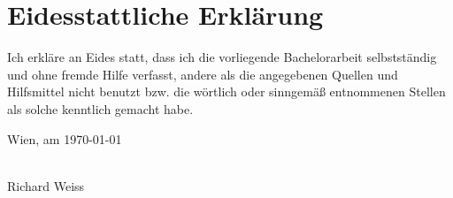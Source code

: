 \chapter*{Eidesstattliche Erklärung}
\thispagestyle{empty}
\thispagestyle{empty}

\vspace*{2cm}

Ich erkläre an Eides statt, dass ich die vorliegende Bachelorarbeit selbstständig und ohne fremde Hilfe verfasst, andere als die angegebenen Quellen und Hilfsmittel nicht benutzt bzw. die wörtlich oder sinngemäß entnommenen Stellen als solche kenntlich gemacht habe.

\vspace*{3cm}

\noindent
Wien, am \today
%
\hfill 
%
\begin{minipage}[t]{5cm}
    \centering
    \underline{\hspace*{5cm}} \\
    \small Richard Weiss
\end{minipage}

\cleardoublepage

